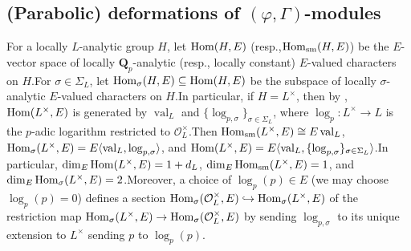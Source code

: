 \documentclass[10pt]{article}
\newcommand{\homo}{{\rm Hom}}
\DeclareMathOperator{\val}{val}
\newcommand{\bQ}{{\mathbf{Q}}}
\newcommand{\cO}{\mathcal O}
\begin{document}
\subsection{(Parabolic) deformations of $(\varphi,\Gamma)$-modules}\label{genedeformations}


For a locally $L$-analytic group $H$, let $\homo(H,E)$ (resp.,\;$\homo_{\mathrm{sm}}(H,E)$) be the $E$-vector space of locally $\bQ_p$-analytic (resp., locally constant) $E$-valued characters on $H$.\;For $\sigma\in \Sigma_L$, let $\homo_{\sigma}(H,E)\subseteq \homo(H,E)$ be the subspace of locally $\sigma$-analytic $E$-valued characters on $H$.\;In particular, if $H=L^{\times}$, then by \cite[Section 1.3.1]{2015Ding}, $\homo(L^{\times},E)$ is generated by $\val_L$ and $\{\log_{p,\sigma}\}_{\sigma\in \Sigma_L}$, where $\log_p:L^{\times}\rightarrow L$ is the $p$-adic logarithm restricted to $\cO_L^{\times}$.\;Then $\homo_{\mathrm{sm}}(L^{\times},E)\cong E\val_L$, $\homo_{\sigma}(L^{\times},E)=E\langle\val_L,\log_{p,\sigma}\rangle$, and $\homo(L^{\times},E)=E\langle\val_L,\{\log_{p,\sigma}\}_{\sigma\in \Sigma_L}\rangle$.\;In particular, $\dim_E\homo(L^{\times},E)=1+d_L$, $\dim_E\homo_{\mathrm{sm}}(L^{\times},E)=1$, and $\dim_E\homo_{\sigma}(L^{\times},E)=2$.\;Moreover, a choice of $\log_p(p)\in E$ (we may choose $\log_p(p)=0$) defines a section $\homo_{\sigma}(\cO_L^{\times},E)\hookrightarrow \homo_{\sigma}(L^{\times},E)$ of the restriction map $\homo_{\sigma}(L^{\times},E)\rightarrow \homo_{\sigma}(\cO_L^{\times},E)$ by sending $\log_{p,\sigma}$ to its unique extension to $L^{\times}$ sending $p$ to $\log_p(p)$.\;
\end{document}

